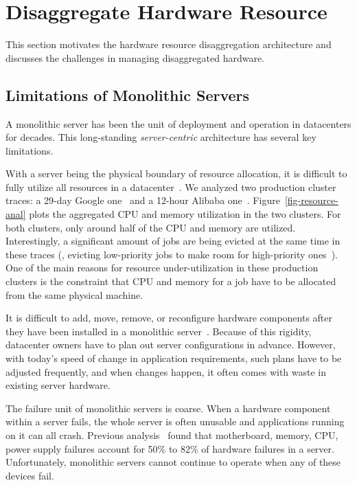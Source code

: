 \section{Disaggregate Hardware Resource}
\label{sec:lego:motivation}




This section
motivates the hardware resource disaggregation architecture
and discusses the challenges in managing disaggregated hardware.

\subsection{Limitations of Monolithic Servers}
\label{sec:lego:monolimit}
A monolithic server has been the unit of deployment and operation in datacenters for decades.
This long-standing {\em server-centric} architecture has several key limitations.

With a server being the physical boundary of resource allocation, 
it is difficult to fully utilize all resources in a datacenter~\cite{Barroso-COMPUTER,Quasar-ASPLOS,PowerNap}.
We analyzed two production cluster traces: a 29-day Google one~\cite{GoogleTrace}
and a 12-hour Alibaba one~\cite{AliTrace}.
Figure~\ref{fig-resource-anal} plots the aggregated CPU and memory utilization in the two clusters.
For both clusters, only around half of the CPU and memory are utilized.
Interestingly,
a significant amount of jobs are being evicted at the same time in these traces
(\eg, evicting low-priority jobs to make room for high-priority ones~\cite{Borg}).
One of the main reasons for resource under-utilization in these production clusters is 
the constraint that CPU and memory for a job have to be allocated from 
the same physical machine.

It is difficult to add, move, remove, or reconfigure hardware components
after they have been installed in a monolithic server~\cite{FB-Wedge100}. %
Because of this rigidity, datacenter owners have to plan out server configurations in advance.
However, with today's speed of change in application requirements, such plans have to be adjusted frequently,
and when changes happen, it often comes with waste in existing server hardware.

The failure unit of monolithic servers is coarse.
When a hardware component within a server fails, %
the whole server is often unusable and applications running on it can all crash.
Previous analysis~\cite{Failure-Disk-FAST07} found that motherboard, memory, CPU, power supply failures account for 
50\% to 82\% of hardware failures in a server.
Unfortunately, monolithic servers cannot continue to operate when any of these devices fail.

